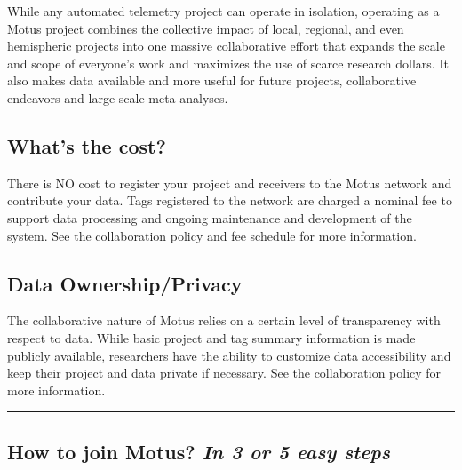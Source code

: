 \documentclass[
]{article}
\begin{document}
While any automated telemetry project can operate in isolation,
operating as a Motus project combines the collective impact of local,
regional, and even hemispheric projects into one massive collaborative
effort that expands the scale and scope of everyone's work and maximizes
the use of scarce research dollars. It also makes data available and
more useful for future projects, collaborative endeavors and large-scale
meta analyses.

\hypertarget{whats-the-cost}{%
\subsection{What's the cost?}\label{whats-the-cost}}

There is NO cost to register your project and receivers to the Motus
network and contribute your data. Tags registered to the network are
charged a nominal fee to support data processing and ongoing maintenance
and development of the system. See the collaboration policy and fee
schedule for more information.

\hypertarget{data-ownershipprivacy}{%
\subsection{Data Ownership/Privacy}\label{data-ownershipprivacy}}

The collaborative nature of Motus relies on a certain level of
transparency with respect to data. While basic project and tag summary
information is made publicly available, researchers have the ability to
customize data accessibility and keep their project and data private if
necessary. See the collaboration policy for more information.

\begin{center}\rule{0.5\linewidth}{0.5pt}\end{center}

\hypertarget{how-to-join-motus-in-3-or-5-easy-steps}{%
\subsection{\texorpdfstring{How to join Motus? \emph{In 3 or 5 easy
steps}}{How to join Motus? In 3 or 5 easy steps}}\label{how-to-join-motus-in-3-or-5-easy-steps}}
\end{document}
